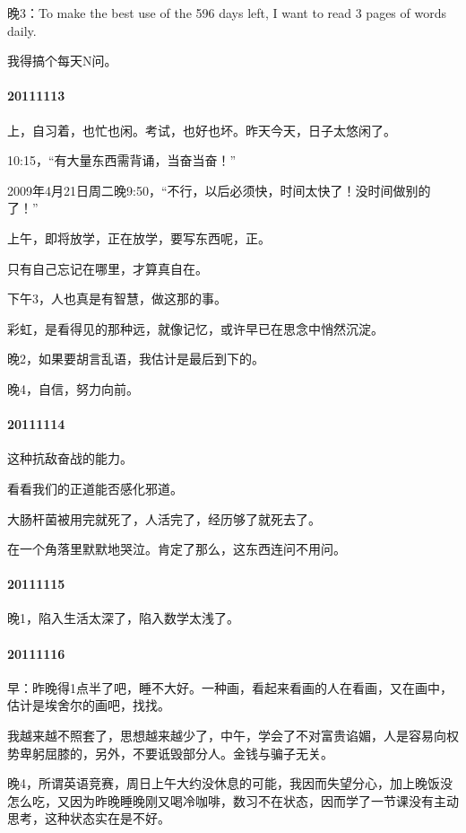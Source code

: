 \documentclass[UTF8]{Diaries}
\begin{document}
晚3：To make the best use of the 596 days left, I want to read 3 pages of words daily.

我得搞个每天N问。


\paragraph{20111113}

上，自习着，也忙也闲。考试，也好也坏。昨天今天，日子太悠闲了。

10:15，“有大量东西需背诵，当奋当奋！”

2009年4月21日周二晚9:50，“不行，以后必须快，时间太快了！没时间做别的了！”

上午，即将放学，正在放学，要写东西呢，正。

只有自己忘记在哪里，才算真自在。

下午3，人也真是有智慧，做这那的事。

彩虹，是看得见的那种远，就像记忆，或许早已在思念中悄然沉淀。

晚2，如果要胡言乱语，我估计是最后到下的。

晚4，自信，努力向前。


\paragraph{20111114}

这种抗敌奋战的能力。

看看我们的正道能否感化邪道。

大肠杆菌被用完就死了，人活完了，经历够了就死去了。

在一个角落里默默地哭泣。肯定了那么，这东西连问不用问。


\paragraph{20111115}

晚1，陷入生活太深了，陷入数学太浅了。


\paragraph{20111116}

早：昨晚得1点半了吧，睡不大好。一种画，看起来看画的人在看画，又在画中，估计是埃舍尔的画吧，找找。

我越来越不照套了，思想越来越少了，中午，学会了不对富贵谄媚，人是容易向权势卑躬屈膝的，另外，不要诋毁部分人。金钱与骗子无关。

晚4，所谓英语竞赛，周日上午大约没休息的可能，我因而失望分心，加上晚饭没怎么吃，又因为昨晚睡晚刚又喝冷咖啡，数习不在状态，因而学了一节课没有主动思考，这种状态实在是不好。
\end{document}
